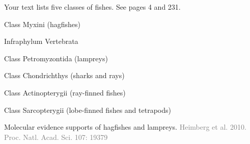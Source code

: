 \documentclass[t]{beamer}
\begin{document}
\begin{frame}[t,plain]{Your text lists five classes of fishes. {\small See pages 4 and 231.}}

	\hspace{5em} Class Myxini (hagfishes)
	
	\hspace{4em} {\small Infraphylum Vertebrata}

	\hspace{5em} Class Petromyzontida (lampreys)

	\hspace{5em} Class Chondrichthys (sharks and rays)

	\hspace{5em} Class Actinopterygii (ray-finned fishes)

	\hspace{5em} Class Sarcopterygii (lobe-finned fishes and tetrapods)
	
	\hangpara{}
	
\end{frame}

{
\begin{frame}[b,plain]{Molecular evidence supports  of hagfishes and lampreys.}
	\hfill\textcolor{gray}{Heimberg et al. 2010. Proc. Natl. Acad. Sci. 107:  19379}
\end{frame}
}
\end{document}
